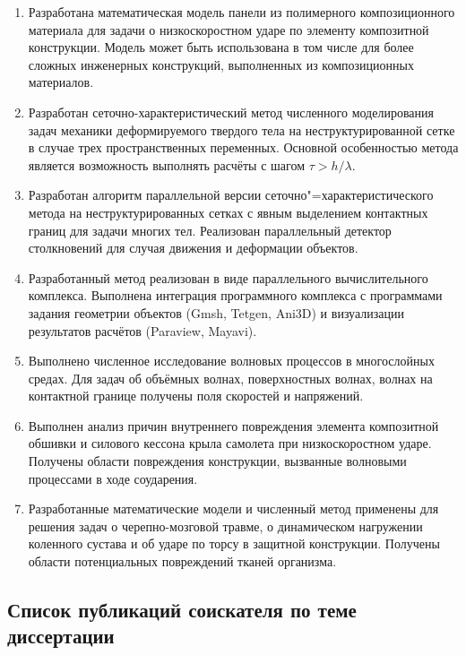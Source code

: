 \begin{enumerate}

\item Разработана математическая модель панели из полимерного композиционного материала для задачи о низкоскоростном ударе по элементу композитной конструкции. Модель может быть использована в том числе для более сложных инженерных конструкций, выполненных из композиционных материалов.

\item Разработан сеточно-характеристический метод численного моделирования задач механики деформируемого твердого тела на неструктурированной сетке в случае трех пространственных переменных. Основной особенностью метода является возможность выполнять расчёты с шагом $\tau > h / \lambda$.

\item Разработан алгоритм параллельной версии сеточно"=характеристического метода на неструктурированных сетках с явным выделением контактных границ для задачи многих тел. Реализован параллельный детектор столкновений для случая движения и деформации объектов.

\item Разработанный метод реализован в виде параллельного вычислительного комплекса. Выполнена интеграция программного комплекса с программами задания геометрии объектов (Gmsh, Tetgen, Ani3D) и визуализации результатов расчётов (Paraview, Mayavi).

\item Выполнено численное исследование волновых процессов в многослойных средах. Для задач об объёмных волнах, поверхностных волнах, волнах на контактной границе получены поля скоростей и напряжений.

\item Выполнен анализ причин внутреннего повреждения элемента композитной обшивки и силового кессона крыла самолета при низкоскоростном ударе. Получены области повреждения конструкции, вызванные волновыми процессами в ходе соударения.

\item Разработанные математические модели и численный метод применены для решения задач о черепно-мозговой травме, о динамическом нагружении коленного сустава и об ударе по торсу в защитной конструкции. Получены области потенциальных повреждений тканей организма.

\end{enumerate}


\subsection*{Список публикаций соискателя по теме диссертации}

